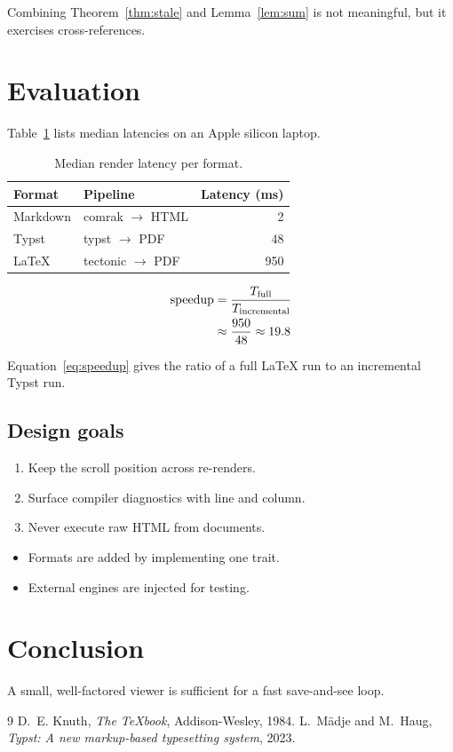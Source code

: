 \documentclass[a4paper,11pt]{article}
\theoremstyle{definition}
\begin{document}
Combining Theorem~\ref{thm:stale} and Lemma~\ref{lem:sum} is not meaningful, but it exercises cross-references.

\section{Evaluation}
Table~\ref{tab:latency} lists median latencies on an Apple silicon laptop.

\begin{table}[h]
\centering
\begin{tabular}{@{}llr@{}}
\toprule
Format   & Pipeline            & Latency (ms) \\
\midrule
Markdown & comrak $\to$ HTML   & 2   \\
Typst    & typst $\to$ PDF     & 48  \\
\LaTeX{} & tectonic $\to$ PDF  & 950 \\
\bottomrule
\end{tabular}
\caption{Median render latency per format.}
\label{tab:latency}
\end{table}

\begin{align}
  \mathrm{speedup} &= \frac{T_{\text{full}}}{T_{\text{incremental}}} \label{eq:speedup} \\
  &\approx \frac{950}{48} \approx 19.8 \notag
\end{align}

Equation~\eqref{eq:speedup} gives the ratio of a full \LaTeX{} run to an incremental Typst run.

\subsection{Design goals}
\begin{enumerate}[label=(\roman*)]
  \item Keep the scroll position across re-renders.
  \item Surface compiler diagnostics with line and column.
  \item Never execute raw HTML from documents.
\end{enumerate}

\begin{itemize}[nosep]
  \item Formats are added by implementing one trait.
  \item External engines are injected for testing.
\end{itemize}

\section{Conclusion}
A small, well-factored viewer is sufficient for a fast save-and-see loop.

\begin{thebibliography}{9}
 D.~E. Knuth, \emph{The \TeX{}book}, Addison-Wesley, 1984.
 L.~M\"adje and M.~Haug, \emph{Typst: A new markup-based typesetting system}, 2023.
\end{thebibliography}
\end{document}
